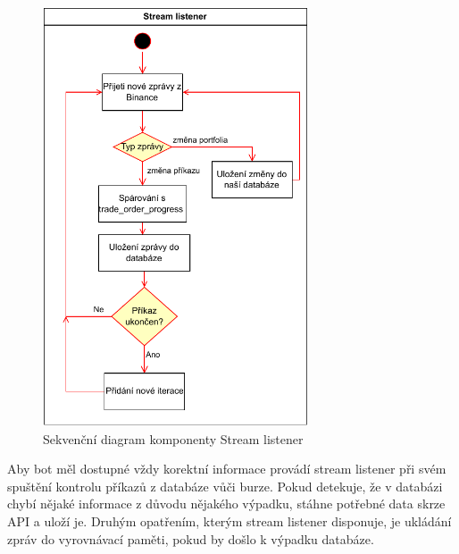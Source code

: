 \begin{figure}
    \centering
    \includegraphics[width=0.7\textwidth]{Figures/listener.pdf}
    \caption{Sekvenční diagram komponenty Stream listener}
    \label{figure:listener}
\end{figure}

Aby bot měl dostupné vždy korektní informace provádí stream listener při svém spuštění kontrolu příkazů z databáze vůči burze. Pokud detekuje, že v databázi chybí nějaké informace z důvodu nějakého výpadku,
stáhne potřebné data skrze API a uloží je. Druhým opatřením, kterým stream listener disponuje, je ukládání zpráv do vyrovnávací paměti, pokud by došlo k výpadku databáze.


